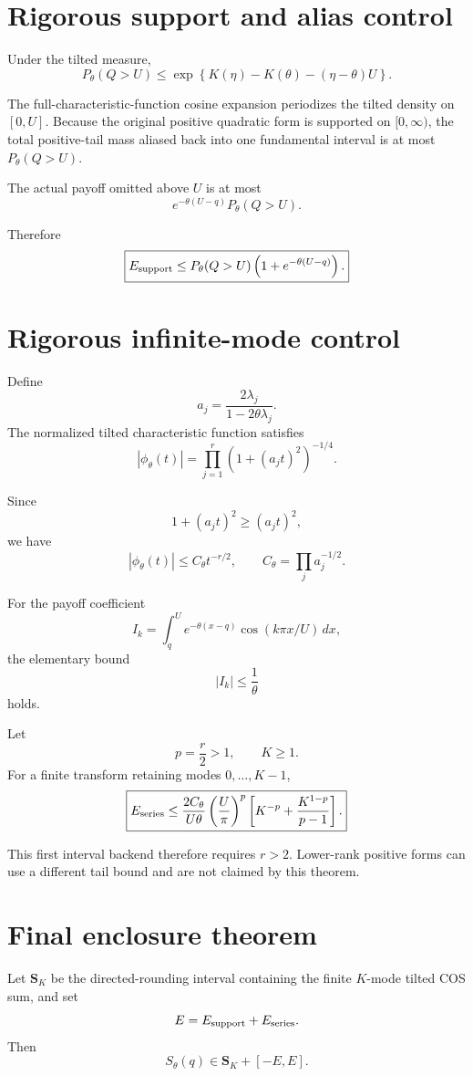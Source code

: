 \section{Rigorous support and alias control}

Under the tilted measure,
\[
P_\theta(Q>U)
\le
\exp\left\{
K(\eta)-K(\theta)-(\eta-\theta)U
\right\}.
\]

The full-characteristic-function cosine expansion periodizes the tilted density
on \([0,U]\).  Because the original positive quadratic form is supported on
\([0,\infty)\), the total positive-tail mass aliased back into one fundamental
interval is at most \(P_\theta(Q>U)\).

The actual payoff omitted above \(U\) is at most
\[
e^{-\theta(U-q)}P_\theta(Q>U).
\]

Therefore
\[
\boxed{
E_{\rm support}
\le
P_\theta(Q>U)
\left(
1+e^{-\theta(U-q)}
\right).
}
\]

\section{Rigorous infinite-mode control}

Define
\[
a_j=
\frac{2\lambda_j}{1-2\theta\lambda_j}.
\]
The normalized tilted characteristic function satisfies
\[
|\phi_\theta(t)|
=
\prod_{j=1}^r
\left(
1+(a_jt)^2
\right)^{-1/4}.
\]

Since
\[
1+(a_jt)^2\ge(a_jt)^2,
\]
we have
\[
|\phi_\theta(t)|
\le
C_\theta t^{-r/2},
\qquad
C_\theta=\prod_j a_j^{-1/2}.
\]

For the payoff coefficient
\[
I_k=
\int_q^U
e^{-\theta(x-q)}
\cos(k\pi x/U)\,dx,
\]
the elementary bound
\[
|I_k|\le\frac1\theta
\]
holds.

Let
\[
p=\frac r2>1,\qquad K\ge1.
\]
For a finite transform retaining modes \(0,\ldots,K-1\),
\[
\boxed{
E_{\rm series}
\le
\frac{2C_\theta}{U\theta}
\left(\frac{U}{\pi}\right)^p
\left[
K^{-p}
+
\frac{K^{1-p}}{p-1}
\right].
}
\]

This first interval backend therefore requires \(r>2\).  Lower-rank positive
forms can use a different tail bound and are not claimed by this theorem.

\section{Final enclosure theorem}

Let \(\boldsymbol S_K\) be the directed-rounding interval containing the finite
\(K\)-mode tilted COS sum, and set
\[
E=E_{\rm support}+E_{\rm series}.
\]
Then
\[
\boxed{
S_\theta(q)
\in
\boldsymbol S_K+[-E,E].
}
\]

